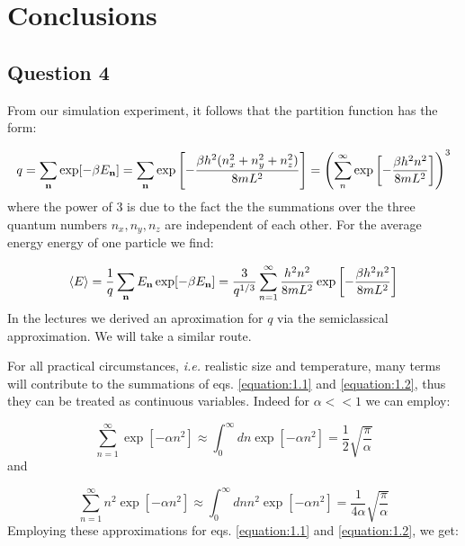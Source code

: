 \documentclass[10pt]{article}
\begin{document}
\maketitle
\pagebreak
\section{Conclusions \cite{IMSSS}}

\subsection{Question 4}
From our simulation experiment, it follows that the partition function has the form:


\begin{equation} %
   q=\sum_{\bf{n}}\exp[-\beta E_{\bf{n}}]=\sum_{\bf{n}}\exp\left[ -\frac{\beta h^2(n_x^2+n_y^2+n_z^2)}{8mL^2}  \right]=\left(\sum_{n}^{\infty}\exp\left[ -\frac{\beta h^2n^2}{8mL^2}  \right]\right)^3
   \label{equation:1.1} 
\end{equation}
%
where the power of 3 is due to the fact the the summations over the three quantum numbers $n_x,n_y,n_z$ are independent of each other. For the average energy energy of one particle we find:

\begin{equation} %
   \langle E \rangle = \frac{1}{q}\sum_{\bf{n}}E_{\bf{n}}\exp[-\beta E_{\bf{n}}]=\frac{3}{q^{1/3}}\sum_{n=1}^{\infty}\frac{h^2n^2}{8mL^2}\exp\left[ - \frac{\beta h^2n^2}{8mL^2}  \right]
   \label{equation:1.2} 
\end{equation}
%
In the lectures we derived an aproximation for $q$ via the semiclassical approximation. We will take a similar route.

For all practical circumstances, \emph{i.e.} realistic size and temperature, many terms will contribute to the summations of eqs. \eqref{equation:1.1} and \eqref{equation:1.2}, thus they can be treated as continuous variables. Indeed for $\alpha < < 1$ we can employ:

\begin{equation} %
   \sum_{n=1}^{\infty} \exp[-\alpha n^2]\approx \int_0^\infty dn\exp[-\alpha n^2]=\frac{1}{2}\sqrt{\frac{\pi}{\alpha}}
   \label{equation:1.3} 
\end{equation}
%
and

\begin{equation} %
   \sum_{n=1}^{\infty} n^2\exp[-\alpha n^2]\approx \int_0^\infty dn n^2\exp[-\alpha n^2]=\frac{1}{4\alpha}\sqrt{\frac{\pi}{\alpha}}
   \label{equation:1.4} 
\end{equation}
%
Employing these approximations for eqs. \eqref{equation:1.1} and \eqref{equation:1.2}, we get:
\end{document}
